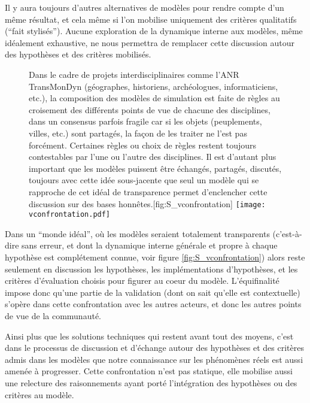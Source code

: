 Il y aura toujours d'autres alternatives de modèles pour rendre compte d'un même résultat, et cela même si l'on mobilise uniquement des critères qualitatifs (\enquote{fait stylisés}). Aucune exploration de la dynamique interne aux modèles, même idéalement exhaustive, ne nous permettra de remplacer cette discussion autour des hypothèses et des critères mobilisés.

\begin{figure}[htbp]
\begin{sidecaption}{Dans le cadre de projets interdisciplinaires comme l'ANR TransMonDyn (géographes, historiens, archéologues, informaticiens, etc.), la composition des modèles de simulation est faite de règles au croisement des différents points de vue de chacune des disciplines, dans un consensus parfois fragile car si les objets (peuplements, villes, etc.) sont partagés, la façon de les traiter ne l'est pas forcément. Certaines règles ou choix de règles restent toujours contestables par l’une ou l’autre des disciplines. Il est d’autant plus important que les modèles puissent être échangés, partagés, discutés, toujours avec cette idée sous-jacente que seul un modèle qui se rapproche de cet idéal de transparence permet d’enclencher cette discussion sur des bases honnêtes.}[fig:S_vconfrontation]
  \centering
 \texttt{[image: vconfrontation.pdf]}
  \end{sidecaption}
\end{figure}

Dans un \enquote{monde idéal}, où les modèles seraient totalement transparents (c'est-à-dire sans erreur, et dont la dynamique interne générale et propre à chaque hypothèse est complétement connue, voir figure \ref{fig:S_vconfrontation}) alors reste seulement en discussion les hypothèses, les implémentations d'hypothèses, et les critères d’évaluation choisis pour figurer au coeur du modèle. L’équifinalité impose donc qu’une partie de la validation (dont on sait qu’elle est contextuelle) s'opère dans cette confrontation avec les autres acteurs, et donc les autres points de vue de la communauté.

Ainsi plus que les solutions techniques qui restent avant tout des moyens, c'est dans le processus de discussion et d'échange autour des hypothèses et des critères admis dans les modèles que notre connaissance sur les phénomènes réels est aussi amenée à progresser. Cette confrontation n'est pas statique, elle mobilise aussi une relecture des raisonnements ayant porté l'intégration des hypothèses ou des critères au modèle. %

